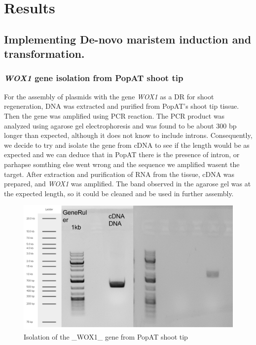 \documentclass[
]{article}
\begin{document}
\hypertarget{results}{%
\section{Results}\label{results}}

\hypertarget{implementing-de-novo-maristem-induction-and-transformation.-1}{%
\subsection{Implementing De-novo maristem induction and
transformation.}\label{implementing-de-novo-maristem-induction-and-transformation.-1}}

\hypertarget{wox1-gene-isolation-from-popat-shoot-tip}{%
\subsubsection{\texorpdfstring{\emph{WOX1} gene isolation from PopAT
shoot
tip}{WOX1 gene isolation from PopAT shoot tip}}\label{wox1-gene-isolation-from-popat-shoot-tip}}

For the assembly of plasmids with the gene \emph{WOX1} as a DR for shoot
regeneration, DNA was extracted and purified from PopAT's shoot tip
tissue. Then the gene was amplified using PCR reaction. The PCR product
was analyzed using agarose gel electrophoresis and was found to be about
300 bp longer than expected, although it does not know to include
introns. Consequently, we decide to try and isolate the gene from cDNA
to see if the length would be as expected and we can deduce that in
PopAT there is the presence of intron, or parhapse somthing else went
wrong and the sequence we amplified wasent the target. After extraction
and purification of RNA from the tissue, cDNA was prepared, and
\emph{WOX1} was amplified. The band observed in the agarose gel was at
the expected length, so it could be cleaned and be used in further
assembly.

\begin{figure}[h]

{\centering \includegraphics[width=1\linewidth]{WOX1_isolation} 

}

\caption{Isolation of the _WOX1_ gene from PopAT shoot tip}\label{fig:wox1 isolation}
\end{figure}
\end{document}
